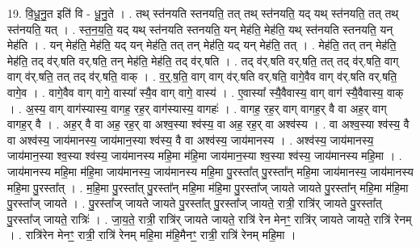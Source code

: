 \documentclass[17pt]{extarticle}
\begin{document}
19. वि॒धू॒नु॒त इति॑ वि - धू॒नु॒ते । . तथ् स्त॑नयति स्तनयति॒ तत् तथ् स्त॑नयति॒ यद् यथ् स्त॑नयति॒ तत् तथ् स्त॑नयति॒ यत् । . स्त॒न॒य॒ति॒ यद् यथ् स्त॑नयति स्तनयति॒ यन् मेह॑ति॒ मेह॑ति॒ यथ् स्त॑नयति स्तनयति॒ यन् मेह॑ति । . यन् मेह॑ति॒ मेह॑ति॒ यद् यन् मेह॑ति॒ तत् तन् मेह॑ति॒ यद् यन् मेह॑ति॒ तत् । . मेह॑ति॒ तत् तन् मेह॑ति॒ मेह॑ति॒ तद् व॑र्.षति वर्.षति॒ तन् मेह॑ति॒ मेह॑ति॒ तद् व॑र्.षति । . तद् व॑र्.षति वर्.षति॒ तत् तद् व॑र्.षति॒ वाग् वाग् व॑र्.षति॒ तत् तद् व॑र्.षति॒ वाक् । . व॒र्॒.ष॒ति॒ वाग् वाग् व॑र्.षति वर्.षति॒ वागे॒वैव वाग् व॑र्.षति वर्.षति॒ वागे॒व । . वागे॒वैव वाग् वागे॒ वास्या᳚ स्यै॒व वाग् वागे॒ वास्य॑ । . ए॒वास्या᳚ स्यै॒वैवास्य॒ वाग् वाग॑ स्यै॒वैवास्य॒ वाक् । . अ॒स्य॒ वाग् वाग॑स्यास्य॒ वागह॒ रह॒र् वाग॑स्यास्य॒ वागहः॑ । . वागह॒ रह॒र् वाग् वागह॒र् वै वा अह॒र् वाग् वागह॒र् वै । . अह॒र् वै वा अह॒ रह॒र् वा अश्व॒स्या श्व॑स्य॒ वा अह॒ रह॒र् वा अश्व॑स्य । . वा अश्व॒स्या श्व॑स्य॒ वै वा अश्व॑स्य॒ जाय॑मानस्य॒ जाय॑मान॒स्या श्व॑स्य॒ वै वा अश्व॑स्य॒ जाय॑मानस्य । . अश्व॑स्य॒ जाय॑मानस्य॒ जाय॑मान॒स्या श्व॒स्या श्व॑स्य॒ जाय॑मानस्य महि॒मा म॑हि॒मा जाय॑मान॒स्या श्व॒स्या श्व॑स्य॒ जाय॑मानस्य महि॒मा । . जाय॑मानस्य महि॒मा म॑हि॒मा जाय॑मानस्य॒ जाय॑मानस्य महि॒मा पु॒रस्ता᳚त् पु॒रस्ता᳚न् महि॒मा जाय॑मानस्य॒ जाय॑मानस्य महि॒मा पु॒रस्ता᳚त् । . म॒हि॒मा पु॒रस्ता᳚त् पु॒रस्ता᳚न् महि॒मा म॑हि॒मा पु॒रस्ता᳚ज् जायते जायते पु॒रस्ता᳚न् महि॒मा म॑हि॒मा पु॒रस्ता᳚ज् जायते । . पु॒रस्ता᳚ज् जायते जायते पु॒रस्ता᳚त् पु॒रस्ता᳚ज् जायते॒ रात्री॒ रात्रि॑र् जायते पु॒रस्ता᳚त् पु॒रस्ता᳚ज् जायते॒ रात्रिः॑ । . जा॒य॒ते॒ रात्री॒ रात्रि॑र् जायते जायते॒ रात्रि॑ रेन मेनꣳ॒॒ रात्रि॑र् जायते जायते॒ रात्रि॑ रेनम् । . रात्रि॑रेन मेनꣳ॒॒ रात्री॒ रात्रि॑ रेनम् महि॒मा म॑हि॒मैनꣳ॒॒ रात्री॒ रात्रि॑ रेनम् महि॒मा । \newline
\end{document}
